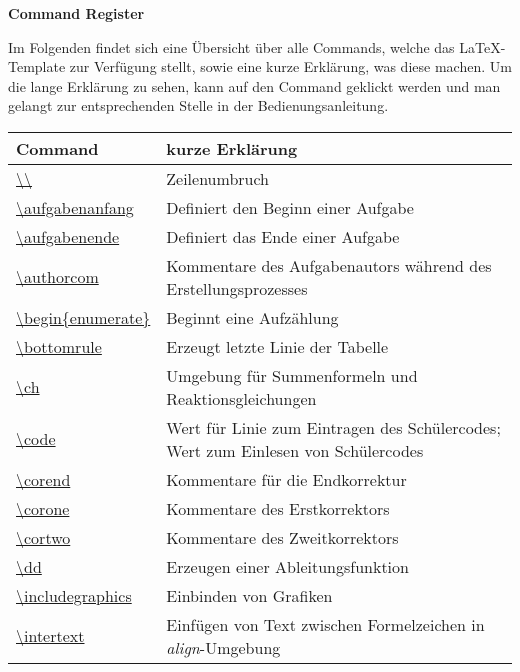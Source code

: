 \documentclass[./main.tex]{subfiles}
\begin{document}
\newpage
{\Large \textbf{Command Register}}\par
Im Folgenden findet sich eine \"Ubersicht \"uber alle Commands, welche das \LaTeX -Template zur Verf\"ugung stellt, sowie eine kurze Erkl\"arung, was diese machen. Um die lange Erkl\"arung zu sehen, kann auf den Command geklickt werden und man gelangt zur entsprechenden Stelle in der Bedienungsanleitung.\\
\begin{tabularx}{\linewidth}{|l|X|}
\hline
Command&kurze Erkl\"arung\hfill\\\hline
    \hyperlink{textbackslash}{\textbackslash{}\textbackslash{}}&Zeilenumbruch\\\hline
    \hyperlink{aufgabenanfang}{\textbackslash{}aufgabenanfang}&Definiert den Beginn einer Aufgabe\\\hline
    \hyperlink{aufgabenende}{\textbackslash{}aufgabenende}&Definiert das Ende einer Aufgabe\\\hline
    \hyperlink{authorcom}{\textbackslash{}authorcom}&Kommentare des Aufgabenautors w\"ahrend des Erstellungsprozesses\\\hline
    \hyperlink{beginenumerate}{\textbackslash{}begin\{enumerate\}}&Beginnt eine Aufz\"ahlung\\\hline
    \hyperlink{bottomrule}{\textbackslash{}bottomrule}&Erzeugt letzte Linie der Tabelle\\\hline
    \hyperlink{ch}{\textbackslash{}ch}&Umgebung f\"ur Summenformeln und Reaktionsgleichungen\\\hline
    \hyperlink{code}{\textbackslash{}code}&Wert \glqq 0\grqq{} f\"ur Linie zum Eintragen des Sch\"ulercodes; Wert \glqq 1\grqq{} zum Einlesen von Sch\"ulercodes\\\hline
    \hyperlink{corend}{\textbackslash{}corend}&Kommentare f\"ur die Endkorrektur\\\hline
    \hyperlink{corone}{\textbackslash{}corone}&Kommentare des Erstkorrektors\\\hline
    \hyperlink{cortwo}{\textbackslash{}cortwo}&Kommentare des Zweitkorrektors\\\hline
    \hyperlink{dd}{\textbackslash{}dd}&Erzeugen einer Ableitungsfunktion\\\hline
    \hyperlink{includegraphics}{\textbackslash{}includegraphics}&Einbinden von Grafiken\\\hline
    \hyperlink{intertext}{\textbackslash{}intertext}&Einf\"ugen von Text zwischen Formelzeichen in \textit{align}-Umgebung\\\hline

\end{tabularx}
\end{document}
